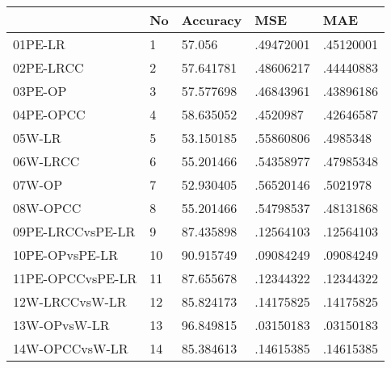 \begin{table}[htbp]
\begin{tabular}{|l|l|l|l|l|}\hline  
 & No  & Accuracy  & MSE  & MAE  \\ \hline  
01PE-LR & 1 & 57.056 & .49472001 & .45120001 \\ \hline 
02PE-LRCC & 2 & 57.641781 & .48606217 & .44440883 \\ \hline 
03PE-OP & 3 & 57.577698 & .46843961 & .43896186 \\ \hline 
04PE-OPCC & 4 & 58.635052 & .4520987 & .42646587 \\ \hline 
05W-LR & 5 & 53.150185 & .55860806 & .4985348 \\ \hline 
06W-LRCC & 6 & 55.201466 & .54358977 & .47985348 \\ \hline 
07W-OP & 7 & 52.930405 & .56520146 & .5021978 \\ \hline 
08W-OPCC & 8 & 55.201466 & .54798537 & .48131868 \\ \hline 
09PE-LRCCvsPE-LR & 9 & 87.435898 & .12564103 & .12564103 \\ \hline 
10PE-OPvsPE-LR & 10 & 90.915749 & .09084249 & .09084249 \\ \hline 
11PE-OPCCvsPE-LR & 11 & 87.655678 & .12344322 & .12344322 \\ \hline 
12W-LRCCvsW-LR & 12 & 85.824173 & .14175825 & .14175825 \\ \hline 
13W-OPvsW-LR & 13 & 96.849815 & .03150183 & .03150183 \\ \hline 
14W-OPCCvsW-LR & 14 & 85.384613 & .14615385 & .14615385 \\ \hline 
  \end{tabular}
\end{table}
